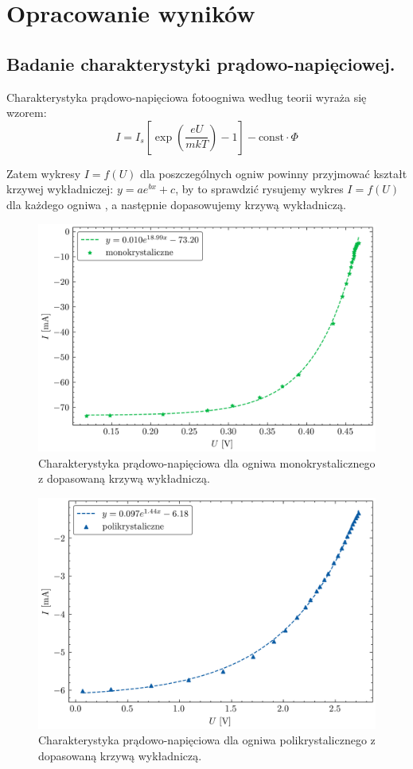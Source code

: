 \documentclass{fizykalab}
\begin{document}
\section{Opracowanie wyników}
\subsection{Badanie charakterystyki prądowo-napięciowej.}

Charakterystyka prądowo-napięciowa fotoogniwa według teorii wyraża się wzorem:
\begin{equation*}
    I = I_s \left[ \exp \left(  \frac{eU}{mkT} \right) -1 \right] - \text{const} \cdot \Phi
\end{equation*}

Zatem wykresy $I = f(U)$ dla poszczególnych ogniw powinny przyjmować
kształt krzywej wykładniczej: $y = a e^{bx} + c$, by to sprawdzić
rysujemy wykres $I = f(U)$ dla każdego ogniwa , a następnie
dopasowujemy krzywą wykładniczą.


\begin{figure}[H]
    \centering
    \includegraphics[width=0.7\linewidth]{mono.png}
    \caption{
    Charakterystyka prądowo-napięciowa dla ogniwa monokrystalicznego z dopasowaną
    krzywą wykładniczą.}
\end{figure}

\begin{figure}[H]
    \centering
    \includegraphics[width=0.7\linewidth]{poli.png}
    \caption{
    Charakterystyka prądowo-napięciowa dla ogniwa polikrystalicznego z dopasowaną
    krzywą wykładniczą.}
\end{figure}
\end{document}
